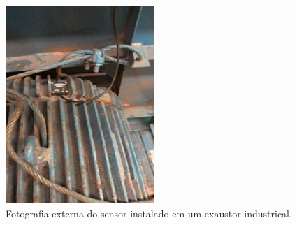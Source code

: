 \begin{figure}[H]
    \caption{Fotografia externa do sensor instalado em um exaustor industrical.}
    \begin{center}
        \includegraphics[scale=1.1]{metodologia/img/sensor_exaustor.jpg}
    \end{center}
    \label{fig:sensor_exaustor}
\end{figure}



%  







%  
